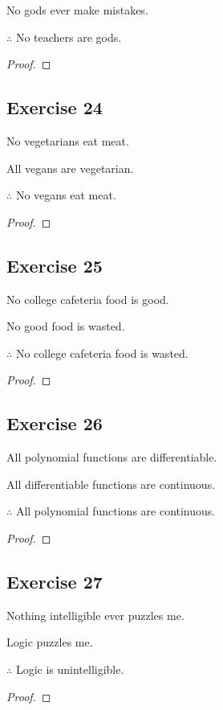 \documentclass[14pt]{extarticle}
\begin{document}
No gods ever make mistakes.

$\therefore$ No teachers are gods.

\begin{proof}

\end{proof}

\subsection{Exercise 24}
No vegetarians eat meat.

All vegans are vegetarian.

$\therefore$ No vegans eat meat.

\begin{proof}

\end{proof}

\subsection{Exercise 25}
No college cafeteria food is good.

No good food is wasted.

$\therefore$ No college cafeteria food is wasted.

\begin{proof}

\end{proof}

\subsection{Exercise 26}
All polynomial functions are differentiable.

All differentiable functions are continuous.

$\therefore$ All polynomial functions are continuous.

\begin{proof}

\end{proof}

\subsection{Exercise 27}
Nothing intelligible ever puzzles me.

Logic puzzles me.

$\therefore$ Logic is unintelligible.

\begin{proof}

\end{proof}
\end{document}
